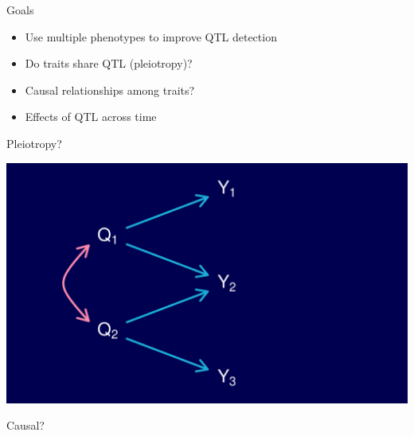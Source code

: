 \documentclass[12pt]{article}
\newcommand{\headsize}{\fontsize{35}{35} \selectfont}
\newcommand{\smallsize}{\fontsize{25}{30} \selectfont}
\begin{document}
\newpage

\headsize \color{myyellow}
\hfill \begin{minipage}{5.75in}
\centering
Goals
\end{minipage}

\vspace{30mm}

\color{mywhite} \smallsize

\hspace*{0.5in}
\begin{minipage}[t]{9.5in}
  \begin{itemize}
    \itemsep18pt
  \item Use multiple phenotypes to improve QTL detection
  \item Do traits share QTL (pleiotropy)?
  \item Causal relationships among traits?
  \item Effects of QTL across time
  \end{itemize}
\end{minipage}



\newpage

\headsize \color{myyellow}
\hfill \begin{minipage}{5.75in}
\centering
Pleiotropy?
\end{minipage}

\vspace{20mm}

\centerline{\includegraphics{Figs/pleiotropy_network.pdf}}


\newpage

\headsize \color{myyellow}
\hfill \begin{minipage}{5.75in}
\centering
Causal?
\end{minipage}
\end{document}
